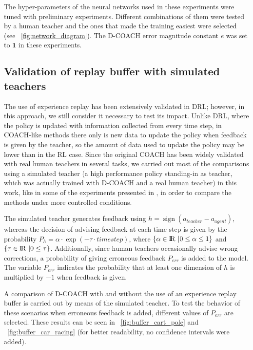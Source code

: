 The hyper-parameters of the neural networks used in these experiments were tuned with preliminary experiments. Different combinations of them were tested by a human teacher and the ones that made the training easiest were selected (see \figurename~{\ref{fig:network_diagram}}). The D-COACH error magnitude constant $e$ was set to $\textbf{1}$ in these experiments.

\subsection{Validation of replay buffer with simulated teachers}
The use of experience replay has been extensively validated in DRL; however, in this approach, we  still consider it necessary to test its impact. Unlike DRL, where the policy is updated with information collected from every time step, in COACH-like methods there only is new data to update the policy when feedback is given by the teacher, so the amount of data used to update the policy may be lower than in the RL case. Since the original COACH has been widely validated with real human teachers in several tasks, we carried out most of the comparisons using  a simulated teacher (a high performance policy standing-in as teacher, which was actually trained with D-COACH and a real human teacher) in this work, like in some of the experiments presented in \cite{Celemin2018AnInteractive}, in order to compare the methods under more controlled conditions. 

The simulated teacher generates feedback using $h = \operatorname{sign}(a_{\mathit{teacher}} - a_{\mathit{agent}})$, whereas the decision of advising feedback at each time step is given by the probability $P_{h} = \alpha \cdot\exp(-\tau\cdot \mathit{timestep})$, where $\{\alpha \in {\rm I\!R}\ | 0 \le \alpha \le 1\}$ and $\{\tau \in {\rm I\!R}\ | 0 \le \tau\}$. Additionally, since human teachers occasionally advise wrong corrections, a probability of giving erroneous feedback $P_{\mathit{err}}$ is added to the model. The variable $P_{\mathit{err}}$ indicates the probability that at least one dimension of $h$ is multiplied by $-1$ when feedback is given.

A comparison of D-COACH with and without the use of an experience replay buffer is carried out by means of the simulated teacher. To test the behavior of these scenarios when erroneous feedback is added, different values of $P_{\mathit{err}}$ are selected. These results can be seen in \figurename~{\ref{fig:buffer_cart_pole}} and \figurename~{\ref{fig:buffer_car_racing}} (for better readability, no confidence intervals were added).

